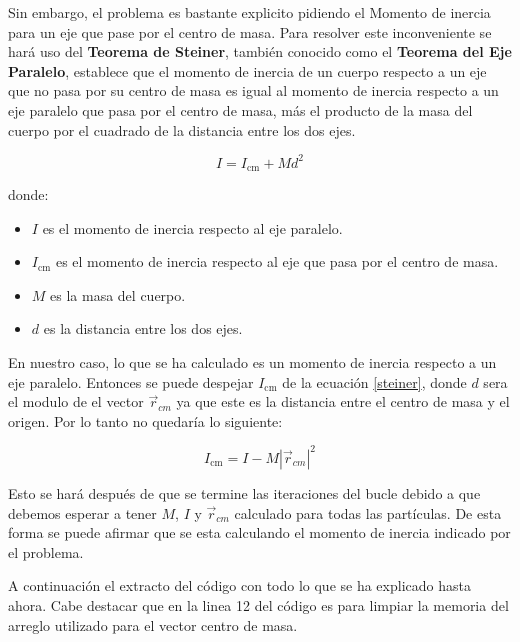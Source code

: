 \documentclass[12pt]{article}
\begin{document}
Sin embargo, el problema es bastante explicito pidiendo el Momento de inercia para un eje que pase por el centro de masa. Para resolver este inconveniente se hará uso del \textbf{Teorema de Steiner}, también conocido como el \textbf{Teorema del Eje Paralelo}, establece que el momento de inercia de un cuerpo respecto a un eje que no pasa por su centro de masa es igual al momento de inercia respecto a un eje paralelo que pasa por el centro de masa, más el producto de la masa del cuerpo por el cuadrado de la distancia entre los dos ejes.

\begin{equation}
    \label{steiner}
    I = I_{\text{cm}} + Md^2
\end{equation}

donde:
\begin{itemize}
    \item \(I\) es el momento de inercia respecto al eje paralelo.
    \item \(I_{\text{cm}}\) es el momento de inercia respecto al eje que pasa por el centro de masa.
    \item \(M\) es la masa del cuerpo.
    \item \(d\) es la distancia entre los dos ejes.
\end{itemize}

En nuestro caso, lo que se ha calculado es un momento de inercia respecto a un eje paralelo. Entonces se puede despejar \(I_{\text{cm}}\) de la ecuación \ref{steiner}, donde \(d\) sera el modulo de el vector $\vec{r}_{cm}$ ya que este es la distancia entre el centro de masa y el origen. Por lo tanto no quedaría lo siguiente:

\begin{equation*}
    \label{steiner}
    I_{\text{cm}} = I - M |\vec{r}_{cm}|^2
\end{equation*}

Esto se hará después de que se termine las iteraciones del bucle debido a que debemos esperar a tener $M$, $I$ y $\vec{r}_{cm}$ calculado para todas las partículas. De esta forma se puede afirmar que se esta calculando el momento de inercia indicado por el problema.

A continuación el extracto del código con todo lo que se ha explicado hasta ahora. Cabe destacar que en la linea 12 del código es para limpiar la memoria del arreglo utilizado para el vector centro de masa. \\
\end{document}
